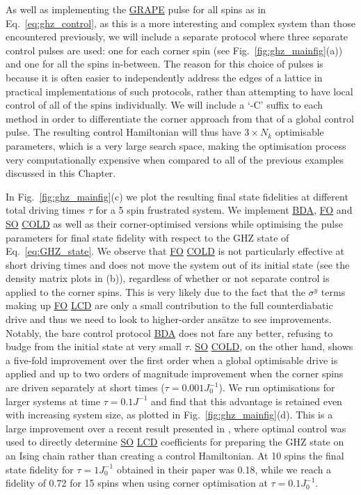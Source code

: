 \documentclass[a4paper,oneside,11pt]{book}
\newcommand{\sy}{\sigma^y}
\newcommand{\acrref}[1]{\hyperref[acr:#1]{#1}}
\begin{document}
As well as implementing the \acrref{GRAPE} pulse for all spins as in Eq.~\ref{eq:ghz_control}, as this is a more interesting and complex system than those encountered previously, we will include a separate protocol where three separate control pulses are used: one for each corner spin (see Fig.~\ref{fig:ghz_mainfig}(a)) and one for all the spins in-between. The reason for this choice of pulses is because it is often easier to independently address the edges of a lattice in practical implementations of such protocols, rather than attempting to have local control of all of the spins individually. We will include a `-C' suffix to each method in order to differentiate the corner approach from that of a global control pulse. The resulting control Hamiltonian will thus have $3 \times N_k$ optimisable parameters, which is a very large search space, making the optimisation process very computationally expensive when compared to all of the previous examples discussed in this Chapter. 

In Fig.~\ref{fig:ghz_mainfig}(c) we plot the resulting final state fidelities at different total driving times $\tau$ for a 5 spin frustrated system. We implement \acrref{BDA}, \acrref{FO} and \acrref{SO} \acrref{COLD} as well as their corner-optimised versions while optimising the pulse parameters for final state fidelity with respect to the GHZ state of Eq.~\eqref{eq:GHZ_state}. We observe that \acrref{FO} \acrref{COLD} is not particularly effective at short driving times and does not move the system out of its initial state (see the density matrix plots in (b)), regardless of whether or not separate control is applied to the corner spins. This is very likely due to the fact that the $\sy$ terms making up \acrref{FO} \acrref{LCD} are only a small contribution to the full counterdiabatic drive and thus we need to look to higher-order ans\"{a}tze to see improvements. Notably, the bare control protocol \acrref{BDA} does not fare any better, refusing to budge from the initial state at very small $\tau$. \acrref{SO} \acrref{COLD}, on the other hand, shows a five-fold improvement over the first order when a global optimisable drive is applied and up to two orders of magnitude improvement when the corner spins are driven separately at short times ($\tau = 0.001J_0^{-1}$).  We run optimisations for larger systems at time $\tau = 0.1J^{-1}$ and find that this advantage is retained even with increasing system size, as plotted in Fig.~\ref{fig:ghz_mainfig}(d). This is a large improvement over a recent result presented in \cite{sun_optimizing_2022}, where optimal control was used to directly determine \acrref{SO} \acrref{LCD} coefficients for preparing the GHZ state on an Ising chain rather than creating a control Hamiltonian. At 10 spins the final state fidelity for $\tau = 1J_0^{-1}$ obtained in their paper was 0.18, while we reach a fidelity of 0.72 for 15 spins when using corner optimisation at $\tau = 0.1J_0^{-1}$. 
\end{document}
